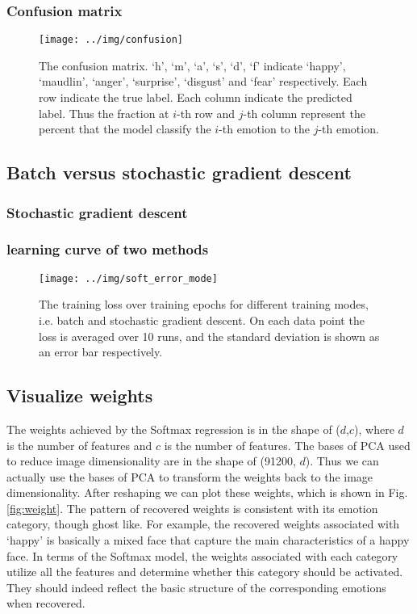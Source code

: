 \documentclass{article} %
\begin{document}
\subsubsection{Confusion matrix}

\begin{figure}[h]
\centering
\texttt{[image: ../img/confusion]}
\caption{The confusion matrix. `h', `m', `a', `s', `d', `f' indicate `happy', `maudlin', `anger', `surprise', `disgust' and `fear' respectively. Each row indicate the true label. Each column indicate the predicted label. Thus the fraction at  $i$-th row and $j$-th column represent the percent that the model classify the $i$-th emotion to the $j$-th emotion.}
\label{fig:confusion}
\end{figure}

\subsection{Batch versus stochastic gradient descent}
\subsubsection{Stochastic gradient descent}
\subsubsection{learning curve of two methods}

\begin{figure}[h]
\centering
\texttt{[image: ../img/soft\_error\_mode]}
\caption{The training loss over training epochs for different training modes, i.e. batch and stochastic gradient descent. On each data point the loss is averaged over 10 runs, and the standard deviation is shown as an error bar respectively.}
\label{fig:soft_error_mode}
\end{figure}


\subsection{Visualize weights}
The weights achieved by the Softmax regression is in the shape of  ($d$,$c$), where $d$ is the number of features and $c$ is the number of features. The bases of PCA used to reduce image dimensionality are in the shape of (91200, $d$). Thus we can actually use the bases of PCA to transform the weights back to the image dimensionality. After reshaping we can plot these weights, which is shown in Fig. \ref{fig:weight}. The pattern of recovered weights is consistent with its emotion category, though ghost like. For example, the recovered weights associated with `happy' is basically a mixed face that capture the main characteristics of a happy face. In terms of the Softmax model, the weights associated with each category utilize all the features and determine whether this category should be activated. They should indeed reflect the basic structure of the corresponding emotions when recovered.
\end{document}
